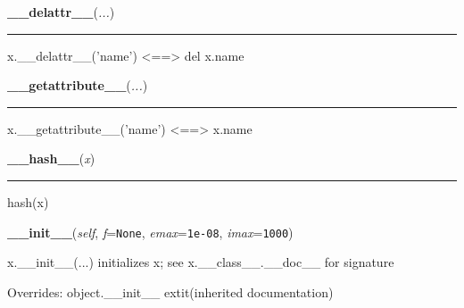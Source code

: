     \begin{boxedminipage}{\textwidth}

    \raggedright \textbf{\_\_delattr\_\_}(\textit{...})

    \vspace{-1.5ex}

    \rule{\textwidth}{0.5\fboxrule}

x.{\_}{\_}delattr{\_}{\_}('name') {\textless}=={\textgreater} del x.name
    \vspace{1ex}

    \end{boxedminipage}

    \label{object:__getattribute__}

    \vspace{0.5ex}

    \begin{boxedminipage}{\textwidth}

    \raggedright \textbf{\_\_getattribute\_\_}(\textit{...})

    \vspace{-1.5ex}

    \rule{\textwidth}{0.5\fboxrule}

x.{\_}{\_}getattribute{\_}{\_}('name') {\textless}=={\textgreater} x.name
    \vspace{1ex}

    \end{boxedminipage}

    \label{object:__hash__}

    \vspace{0.5ex}

    \begin{boxedminipage}{\textwidth}

    \raggedright \textbf{\_\_hash\_\_}(\textit{x})

    \vspace{-1.5ex}

    \rule{\textwidth}{0.5\fboxrule}

hash(x)
    \vspace{1ex}

    \end{boxedminipage}

    \vspace{0.5ex}

    \begin{boxedminipage}{\textwidth}

    \raggedright \textbf{\_\_init\_\_}(\textit{self}, \textit{f}=\texttt{None}, \textit{emax}=\texttt{1e-08}, \textit{imax}=\texttt{1000})


x.{\_}{\_}init{\_}{\_}(...) initializes x; see x.{\_}{\_}class{\_}{\_}.{\_}{\_}doc{\_}{\_} for signature
    \vspace{1ex}

      Overrides: object.\_\_init\_\_ 	extit{(inherited documentation)}

    \end{boxedminipage}

